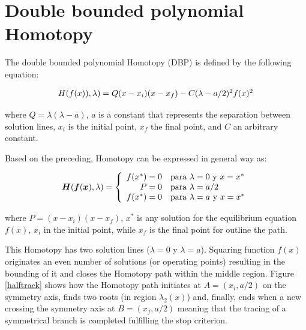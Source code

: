 \documentclass[conference,letterpaper,twocolumn]{IEEEtran}
\newcommand{\pig}[1]{\mbox{\boldmath ${#1}$}	}
\begin{document}
\section{Double bounded polynomial Homotopy}

The double bounded polynomial Homotopy (DBP) is defined by the following equation:

\begin{equation}
{\small
\begin{array}{l}
H(f(x)),\lambda )=Q(x-x_i)(x-x_f) -C(\lambda-a/2)^2 f(x)^2
\end{array}}
\label{homotopiaP}
\end{equation}

where $Q=\lambda(\lambda-a)$, $a$ is a constant that represents the separation between solution lines, $x_i$ is the initial point, $x_f$ the final point, and $C$ an arbitrary constant.

Based on the preceding, Homotopy can be expressed in general way as:

\begin{displaymath}
\pig{H}(\pig{f}(\pig{x}),\lambda ) = \left\{\begin{array}{rl}
f(x^*)=0 & \textrm{para $\lambda=0$ y $x=x^*$}\\
P=0 & \textrm{para $\lambda=a/2$}\\
f(x^*)=0 & \textrm{para $\lambda=a$ y $x=x^*$}
\end{array}\right.
\end{displaymath}

where $P=(x-x_i)(x-x_f)$, $x^*$ is any solution for the equilibrium equation $f(x)$, $x_i$ in the initial point, while $x_f$ is the final point for outline the path.

This Homotopy has two solution lines ($\lambda=0$ y $\lambda=a$). Squaring function $f(x)$ originates an even number of solutions (or operating points) resulting in the bounding of it and closes the Homotopy path within the middle region. Figure \ref{halftrack} shows how the Homotopy path initiates at $A=(x_i,a/2)$ on the symmetry axis, finds two roots (in region $\lambda_2(x)$) and, finally, ends when a new crossing the symmetry axis at $B=(x_f,a/2)$ meaning that the tracing of a symmetrical branch is completed fulfilling the stop criterion.
\end{document}

